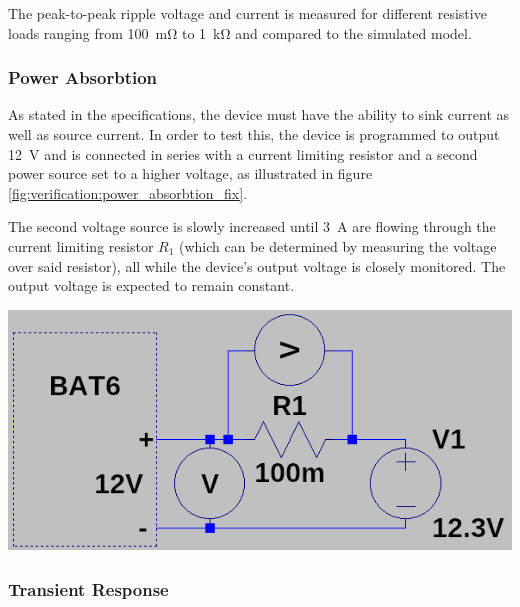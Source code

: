 The peak-to-peak ripple voltage  and current is measured for different resistive
loads ranging from \SI{100}{\milli\ohm} to \SI{1}{\kilo\ohm} and compared to the
simulated model.

\subsubsection{Power Absorbtion}

\begin{minipage}{0.5\textwidth}
    As  stated  in  the  specifications,  the device  must  have  the  ability
    to  sink   current  as  well  as   source  current.   In  order   to  test
    this,  the   device  is  programmed   to  output  \SI{12}{\volt}   and  is
    connected  in  series  with  a  current limiting  resistor  and  a  second
    power  source  set   to  a  higher  voltage,  as   illustrated  in  figure
    \ref{fig:verification:power_absorbtion_fix}.

    The second  voltage source is  slowly increased until  \SI{3}{\ampere} are
    flowing  through  the  current  limiting  resistor  $R_1$  (which  can  be
    determined by  measuring the  voltage over said  resistor), all  while the
    device's  output  voltage  is  closely monitored. The  output  voltage  is
    expected to remain constant.
\end{minipage}
\begin{minipage}{0.5\textwidth}
    \centering
    \includegraphics[width=.9\textwidth]{images/sim/power-absorbtion-fixture.png}
    \label{fig:verification:power_absorbtion_fix}
\end{minipage}



\subsubsection{Transient Response}

